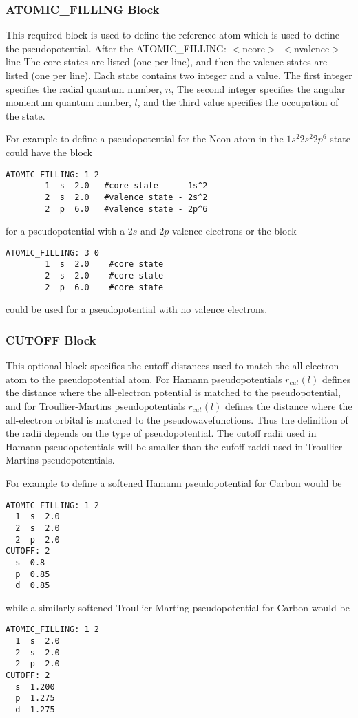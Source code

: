 \subsubsection{ATOMIC\_FILLING Block}
This required block is used to define the reference atom which is used
to define the pseudopotential. After the ATOMIC\_FILLING: $<$ncore$>$ $<$nvalence$>$ line
The core states are listed (one per line), and then the valence states are listed (one per line).  
Each state contains two integer and a value.  The first integer specifies the radial quantum number, $n$,
The second integer specifies the angular momentum quantum number, $l$, and the third value
specifies the occupation of the state.

For example to define a pseudopotential
for the Neon atom in the $1s^2 2s^2 2p^6$ state
could have the block
\begin{verbatim}
ATOMIC_FILLING: 1 2
        1  s  2.0   #core state    - 1s^2 
        2  s  2.0   #valence state - 2s^2
        2  p  6.0   #valence state - 2p^6
\end{verbatim}
for a pseudopotential with a $2s$ and $2p$ valence electrons
or the block
\begin{verbatim}
ATOMIC_FILLING: 3 0
        1  s  2.0    #core state
        2  s  2.0    #core state
        2  p  6.0    #core state
\end{verbatim}
could be used for a pseudopotential with no valence electrons.


\subsubsection{CUTOFF Block}
This optional block specifies the cutoff distances used
to match the all-electron atom to the pseudopotential atom.  For
Hamann pseudopotentials $r_{cut}(l)$ defines the distance
where the all-electron potential is matched to the pseudopotential, and
for Troullier-Martins pseudopotentials $r_{cut}(l)$ defines the distance
where the all-electron orbital is matched to the pseudowavefunctions. 
Thus the definition of the radii depends on the type of pseudopotential.  
The cutoff radii used in Hamann pseudopotentials will be smaller than
the cufoff raddi used in Troullier-Martins pseudopotentials.  

For example to define a softened Hamann pseudopotential for
Carbon would be
\begin{verbatim}
ATOMIC_FILLING: 1 2
  1  s  2.0
  2  s  2.0
  2  p  2.0
CUTOFF: 2
  s  0.8
  p  0.85
  d  0.85
\end{verbatim}
while a similarly softened Troullier-Marting pseudopotential
for Carbon would be
\begin{verbatim}
ATOMIC_FILLING: 1 2
  1  s  2.0
  2  s  2.0
  2  p  2.0
CUTOFF: 2
  s  1.200
  p  1.275
  d  1.275
\end{verbatim}


